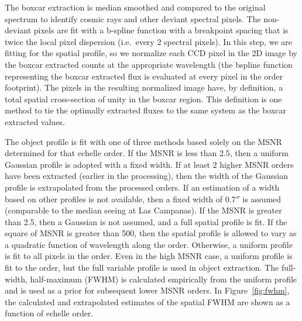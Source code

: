 \documentclass[12pt,preprint]{aastex}
\begin{document}
The boxcar extraction is median smoothed and compared to the original spectrum
to identify cosmic rays and other deviant spectral pixels.  The non-deviant 
pixels are fit with a b-spline function with a breakpoint spacing that is twice
the local pixel dispersion (i.e.\ every 2 spectral pixels).
In this step, we are fitting for the spatial profile, so we normalize each 
CCD pixel in the 2D image by the boxcar extracted counts at the appropriate 
wavelength (the bspline function representing the boxcar extracted flux is
evaluated at every pixel in the order footprint).  
The pixels in the resulting normalized image have, by definition, a total 
spatial cross-section of unity in the boxcar region.
This definition is one method to tie the optimally extracted fluxes to the same 
system as the boxcar extracted values. 

The object profile is fit with one of three methods based solely on the
MSNR determined for that echelle order.  If the MSNR is less than 2.5, 
then a uniform Gaussian profile is adopted with a fixed width.  If at least 2 
higher MSNR orders have been extracted (earlier in the processing), then 
the width of the Gaussian profile is extrapolated from the processed orders.
If an estimation of a width based on other profiles is not available, then a
fixed width of 0.7$''$ is assumed (comparable to the median seeing at
Las Campanas).  If the MSNR is greater than 2.5, then a
Gaussian is not assumed, and a full spatial profile is fit.  If the square
of MSNR is greater than 500, then the spatial profile is allowed to vary as
a quadratic function of wavelength along the order.  
Otherwise, a uniform profile is fit to all pixels in the order.  
Even in the high MSNR case, a uniform profile
is fit to the order, but the full variable profile is used in object 
extraction.  The full-width, half-maximum (FWHM) is calculated empirically
from the uniform profile and is used as a prior for subsequent lower MSNR 
orders.  In Figure~\ref{fig:fwhm}, the calculated and extrapolated 
estimates of the spatial FWHM are shown as a function of echelle order.
\end{document}
